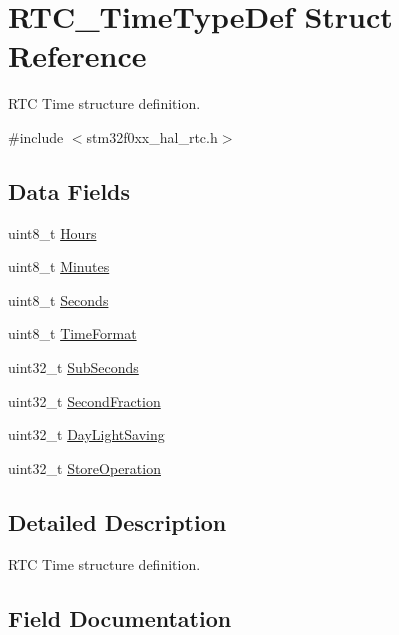 \hypertarget{struct_r_t_c___time_type_def}{}\section{R\+T\+C\+\_\+\+Time\+Type\+Def Struct Reference}
\label{struct_r_t_c___time_type_def}


R\+TC Time structure definition.  




{\ttfamily \#include $<$stm32f0xx\+\_\+hal\+\_\+rtc.\+h$>$}

\subsection*{Data Fields}
\begin{DoxyCompactItemize}
\item 
uint8\+\_\+t \hyperlink{struct_r_t_c___time_type_def_a836edba653a6aa73789d68e7bd2ee757}{Hours}
\item 
uint8\+\_\+t \hyperlink{struct_r_t_c___time_type_def_a37e1bd6f0ab1dcc18f95f8d0193cd26e}{Minutes}
\item 
uint8\+\_\+t \hyperlink{struct_r_t_c___time_type_def_a42120bdc40e6f49bb5b4dec78220c87b}{Seconds}
\item 
uint8\+\_\+t \hyperlink{struct_r_t_c___time_type_def_a7ca2cf99b14ee49dae5c787b2800f482}{Time\+Format}
\item 
uint32\+\_\+t \hyperlink{struct_r_t_c___time_type_def_a8059189ca602372f4759497c776c8fbb}{Sub\+Seconds}
\item 
uint32\+\_\+t \hyperlink{struct_r_t_c___time_type_def_a0a6d7b93d51459e83607fd65d86aa497}{Second\+Fraction}
\item 
uint32\+\_\+t \hyperlink{struct_r_t_c___time_type_def_a07a6bb22b53266f71c1b97b5e6aeb5e4}{Day\+Light\+Saving}
\item 
uint32\+\_\+t \hyperlink{struct_r_t_c___time_type_def_a26435214093d019db4d67a77a8ad99d1}{Store\+Operation}
\end{DoxyCompactItemize}


\subsection{Detailed Description}
R\+TC Time structure definition. 

\subsection{Field Documentation}
\mbox{\label{struct_r_t_c___time_type_def_a07a6bb22b53266f71c1b97b5e6aeb5e4}} 
